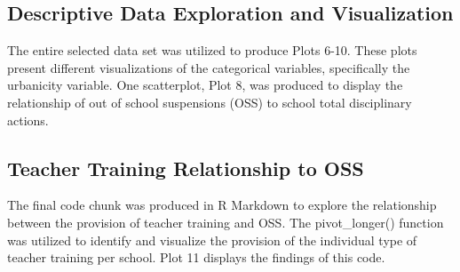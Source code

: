 \documentclass[
  man, fleqn, noextraspace]{apa6}
\begin{document}
\hypertarget{descriptive-data-exploration-and-visualization}{%
\subsection{Descriptive Data Exploration and Visualization}\label{descriptive-data-exploration-and-visualization}}

The entire selected data set was utilized to produce Plots 6-10. These plots present different visualizations of the categorical variables, specifically the urbanicity variable. One scatterplot, Plot 8, was produced to display the relationship of out of school suspensions (OSS) to school total disciplinary actions.

\hypertarget{teacher-training-relationship-to-oss}{%
\subsection{Teacher Training Relationship to OSS}\label{teacher-training-relationship-to-oss}}

The final code chunk was produced in R Markdown to explore the relationship between the provision of teacher training and OSS. The pivot\_longer() function was utilized to identify and visualize the provision of the individual type of teacher training per school. Plot 11 displays the findings of this code.
\end{document}
